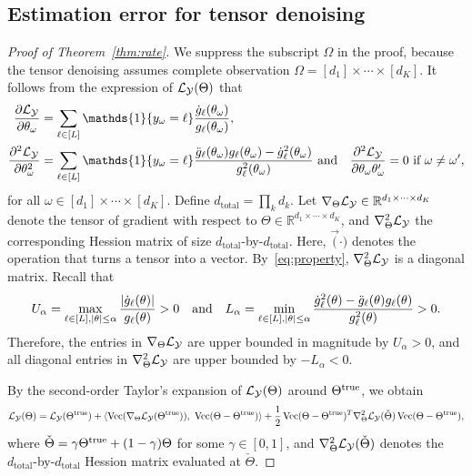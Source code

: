 \documentclass{article}
\theoremstyle{plain}
\theoremstyle{definition}
\begin{document}
\subsection{Estimation error for tensor denoising}\label{sec:proofMSE}
\begin{proof}[Proof of Theorem~\ref{thm:rate}]
We suppress the subscript $\Omega$ in the proof, because the tensor denoising assumes complete observation $\Omega=[d_1]\times \cdots \times [d_K]$. It follows from the expression of $\mathcal{L}_{\mathcal{Y}}(\Theta)$ that
\begin{align}\label{eq:property}
{\partial \flogl\over \partial \theta_\omega}&=\sum_{\ell\in[L]}\mathds{1}\{y_{\omega}=\ell\}
{\dot{g}_\ell(\theta_\omega)\over g_\ell(\theta_\omega)},\notag\\
{\partial^2 \flogl\over \partial \theta_\omega^2}&=\sum_{\ell\in[L]}\mathds{1}\{y_\omega=\ell\}{\ddot{g}_\ell(\theta_\omega)g_\ell(\theta_\omega)-\dot{g}^2_\ell(\theta_\omega)\over g^2_\ell(\theta_\omega)}\ \text{and}\quad
{\partial^2 \flogl\over \partial \theta_\omega \theta_\omega'}=0\ \text{if}\ \omega\neq \omega',
\end{align}
for all $\omega\in[d_1]\times \cdots \times [d_K]$.
Define $d_{\text{total}}=\prod_k d_k$. Let $\nabla_{\Theta}\mathcal{L}_{\mathcal{Y}}\in\mathbb{R}^{d_1\times\cdots\times d_K}$ denote the tensor of gradient with respect to $\Theta\in\mathbb{R}^{d_1\times \cdots\times d_K}$, and $\nabla^2_{\Theta}\mathcal{L}_{\mathcal{Y}}$ the corresponding Hession matrix of size $d_\text{total}$-by-$d_{\text{total}}$. Here, $\Vec(\cdot)$ denotes the operation that turns a tensor into a vector. By~\eqref{eq:property}, $\nabla^2_{\Theta}\mathcal{L}_{\mathcal{Y}}$ is a diagonal matrix. Recall that
\begin{equation}\label{eq:bound}
U_\alpha=\max_{\ell\in[L],|\theta|\leq \alpha}{|\dot{g}_\ell(\theta)|\over g_\ell(\theta)}>0 \quad \text{and}\quad
L_\alpha=\min_{\ell\in[L],|\theta|\leq \alpha} {\dot{g}^2_\ell(\theta)-\ddot{g}_\ell(\theta)g_\ell(\theta)\over g^2_\ell(\theta)}>0.
\end{equation}
Therefore, the entries in $\nabla_{\Theta}\mathcal{L}_{\mathcal{Y}}$ are upper bounded in magnitude by $U_\alpha>0$, and all diagonal entries in $\nabla^2_{\Theta}\mathcal{L}_{\mathcal{Y}}$ are upper bounded by $-L_{\alpha}<0$.

By the second-order Taylor's expansion of $\mathcal{L}_{\mathcal{Y}}(\Theta)$ around $\Theta^{\mathrm{true}}$, we obtain
\begin{equation}\label{eq:taylor}
\flogl(\Theta)=\flogl(\trueT)+\langle\Vec(\fplogl(\trueT)),\ \Vec(\Theta-\trueT)\rangle+{1\over 2}\Vec(\Theta-\trueT)^T\fpplogl(\check\Theta)\Vec(\Theta-\trueT),
\end{equation}
where $\check\Theta=\gamma\Theta^{\mathrm{true}}+(1-\gamma)\Theta$ for some $\gamma\in[0,1]$, and $\nabla^2_{\Theta}\mathcal{L}_{\mathcal{Y}}(\check\Theta)$ denotes the $d_{\text{total}}$-by-$d_\text{total}$ Hession matrix evaluated at $\check\Theta$.


\end{proof}
\end{document}
